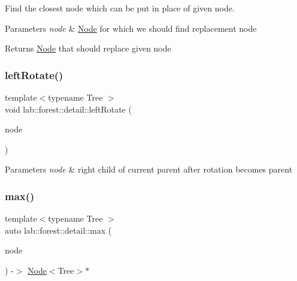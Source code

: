 Find the closest node which can be put in place of given node. 


\begin{DoxyParams}{Parameters}
{\em node} & \hyperlink{structlab_1_1forest_1_1detail_1_1Node}{Node} for which we should find replacement node \\
\hline
\end{DoxyParams}
\begin{DoxyReturn}{Returns}
\hyperlink{structlab_1_1forest_1_1detail_1_1Node}{Node} that should replace given node 
\end{DoxyReturn}
\mbox{\label{namespacelab_1_1forest_1_1detail_a726d38cf7417fa78151bd039ebb75acc}} 
\subsubsection{\texorpdfstring{left\+Rotate()}{leftRotate()}}
{\footnotesize\ttfamily template$<$typename Tree $>$ \\
void lab\+::forest\+::detail\+::left\+Rotate (\begin{DoxyParamCaption}\item[{\hyperlink{structlab_1_1forest_1_1detail_1_1Node}{Node}$<$ Tree $>$ $\ast$}]{node }\end{DoxyParamCaption})}


\begin{DoxyParams}{Parameters}
{\em node} & right child of current parent after rotation becomes parent \\
\hline
\end{DoxyParams}
\mbox{\label{namespacelab_1_1forest_1_1detail_a1b854c05579f96cde71983fa181a4f5f}} 
\subsubsection{\texorpdfstring{max()}{max()}}
{\footnotesize\ttfamily template$<$typename Tree $>$ \\
auto lab\+::forest\+::detail\+::max (\begin{DoxyParamCaption}\item[{\hyperlink{structlab_1_1forest_1_1detail_1_1Node}{Node}$<$ Tree $>$ $\ast$}]{node }\end{DoxyParamCaption}) -\/$>$ \hyperlink{structlab_1_1forest_1_1detail_1_1Node}{Node}$<$Tree$>$$\ast$ \hspace{0.3cm}{\ttfamily [noexcept]}}

